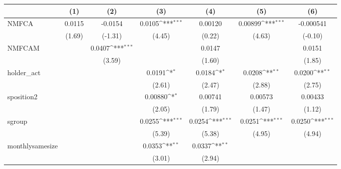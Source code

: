{
\def\sym#1{\ifmmode^{#1}\else\(^{#1}\)\fi}
\begin{tabular}{l*{6}{c}}
\hline\hline
            &\multicolumn{1}{c}{(1)}         &\multicolumn{1}{c}{(2)}         &\multicolumn{1}{c}{(3)}         &\multicolumn{1}{c}{(4)}         &\multicolumn{1}{c}{(5)}         &\multicolumn{1}{c}{(6)}         \\
\hline
NMFCA       &      0.0115         &     -0.0154         &      0.0105\sym{***}&     0.00120         &     0.00899\sym{***}&   -0.000541         \\
            &      (1.69)         &     (-1.31)         &      (4.45)         &      (0.22)         &      (4.63)         &     (-0.10)         \\
[1em]
NMFCAM      &                     &      0.0407\sym{***}&                     &      0.0147         &                     &      0.0151         \\
            &                     &      (3.59)         &                     &      (1.60)         &                     &      (1.85)         \\
[1em]
holder\_act  &                     &                     &      0.0191\sym{*}  &      0.0184\sym{*}  &      0.0208\sym{**} &      0.0200\sym{**} \\
            &                     &                     &      (2.61)         &      (2.47)         &      (2.88)         &      (2.75)         \\
[1em]
sposition2  &                     &                     &     0.00880\sym{*}  &     0.00741         &     0.00573         &     0.00433         \\
            &                     &                     &      (2.05)         &      (1.79)         &      (1.47)         &      (1.12)         \\
[1em]
sgroup      &                     &                     &      0.0255\sym{***}&      0.0254\sym{***}&      0.0251\sym{***}&      0.0250\sym{***}\\
            &                     &                     &      (5.39)         &      (5.38)         &      (4.95)         &      (4.94)         \\
[1em]
monthlysamesize&                     &                     &      0.0353\sym{**} &      0.0337\sym{**} &                     &                     \\
            &                     &                     &      (3.01)         &      (2.94)         &                     &                     \\

\end{tabular}}
